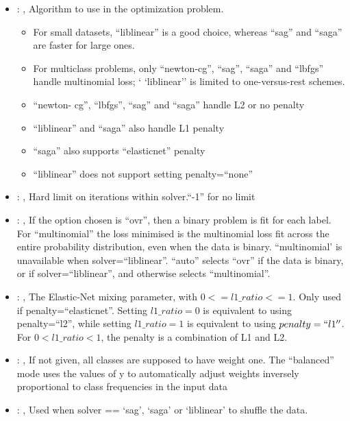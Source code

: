 \begin{itemize}
    \item {}: , 
      Algorithm to use in the optimization problem.
      \begin{itemize}                                                    \item For small datasets,
      ``liblinear'' is a good choice, whereas ``sag'' and ``saga'' are faster for large ones.
      \item For multiclass problems, only ``newton-cg'', ``sag'', ``saga'' and ``lbfgs'' handle
      multinomial loss; `                                                    `liblinear'' is limited
      to one-versus-rest schemes.                                                    \item ``newton-
      cg'', ``lbfgs'', ``sag'' and ``saga'' handle L2 or no penalty
      \item ``liblinear'' and ``saga'' also handle L1 penalty
      \item ``saga'' also supports ``elasticnet'' penalty
      \item ``liblinear'' does not support setting penalty=``none''
      \end{itemize}

    \item {}: , 
      Hard limit on iterations within solver.``-1'' for no limit

    \item {}: , 
      If the option chosen is ``ovr'', then a binary problem is fit for each label. For
      ``multinomial''                                                  the loss minimised is the
      multinomial loss fit across the entire probability distribution, even when the
      data is binary. ``multinomial' is unavailable when solver=``liblinear''. ``auto'' selects
      ``ovr'' if the data is                                                  binary, or if
      solver=``liblinear'', and otherwise selects ``multinomial''.

    \item {}: , 
      The Elastic-Net mixing parameter, with $0 <= l1\_ratio <= 1$. Only used if
      penalty=``elasticnet''.                                                  Setting $l1\_ratio=0$
      is equivalent to using penalty=``l2'', while setting $l1\_ratio=1$ is equivalent to using
      $penalty=``l1''$. For $0 < l1\_ratio <1$, the penalty is a combination of L1 and L2.

    \item {}: \xmlDesc{[balanced]}, 
      If not given, all classes are supposed to have weight one.
      The “balanced” mode uses the values of y to automatically adjust weights
      inversely proportional to class frequencies in the input data

    \item {}: , 
      Used when solver == ‘sag’, ‘saga’ or ‘liblinear’ to shuffle the data.
  \end{itemize}


